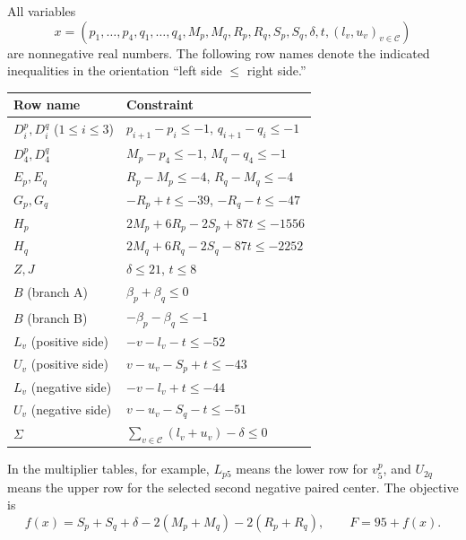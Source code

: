 \documentclass[11pt,a4paper]{article}
\theoremstyle{remark}
\begin{document}
All variables
\[
x=(p_1,\ldots,p_4,q_1,\ldots,q_4,M_p,M_q,R_p,R_q,S_p,S_q,
\delta,t,(l_v,u_v)_{v\in\mathcal C})
\]
are nonnegative real numbers. The following row names denote the indicated
inequalities in the orientation ``left side $\leq$ right side.''
\begin{center}\small
\begin{tabular}{ll}
\toprule
Row name&Constraint\\
\midrule
$D_i^p,D_i^q$ ($1\leq i\leq3$)&$p_{i+1}-p_i\leq-1$, $q_{i+1}-q_i\leq-1$\\
$D_4^p,D_4^q$&$M_p-p_4\leq-1$, $M_q-q_4\leq-1$\\
$E_p,E_q$&$R_p-M_p\leq-4$, $R_q-M_q\leq-4$\\
$G_p,G_q$&$-R_p+t\leq-39$, $-R_q-t\leq-47$\\
$H_p$&$2M_p+6R_p-2S_p+87t\leq-1556$\\
$H_q$&$2M_q+6R_q-2S_q-87t\leq-2252$\\
$Z,J$&$\delta\leq21$, $t\leq8$\\
$B$ (branch A)&$\beta_p+\beta_q\leq0$\\
$B$ (branch B)&$-\beta_p-\beta_q\leq-1$\\
$L_v$ (positive side)&$-v-l_v-t\leq-52$\\
$U_v$ (positive side)&$v-u_v-S_p+t\leq-43$\\
$L_v$ (negative side)&$-v-l_v+t\leq-44$\\
$U_v$ (negative side)&$v-u_v-S_q-t\leq-51$\\
$\Sigma$&$\sum_{v\in\mathcal C}(l_v+u_v)-\delta\leq0$\\
\bottomrule
\end{tabular}
\end{center}
In the multiplier tables, for example, $L_{p5}$ means the lower row for
$v^p_5$, and $U_{2q}$ means the upper row for the selected second negative
paired center. The objective is
\[
 f(x)=S_p+S_q+\delta-2(M_p+M_q)-2(R_p+R_q),\qquad F=95+f(x).
\]
\end{document}
